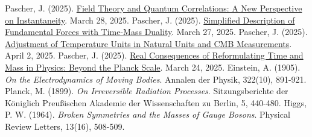 \documentclass[a4paper,12pt]{article}
\begin{document}
\begin{thebibliography}{99}
		 Pascher, J. (2025). \href{https://github.com/jpascher/T0-Time-Mass-Duality/tree/main/2/pdf/English/FeldtheorieQuantenEn.pdf}{Field Theory and Quantum Correlations: A New Perspective on Instantaneity}. March 28, 2025.
		 Pascher, J. (2025). \href{https://github.com/jpascher/T0-Time-Mass-Duality/tree/main/2/pdf/English/VierKraefteZeitMasseEn.pdf}{Simplified Description of Fundamental Forces with Time-Mass Duality}. March 27, 2025.
		 Pascher, J. (2025). \href{https://github.com/jpascher/T0-Time-Mass-Duality/tree/main/2/pdf/English/TempEinheitenCMBEn.pdf}{Adjustment of Temperature Units in Natural Units and CMB Measurements}. April 2, 2025.
		 Pascher, J. (2025). \href{https://github.com/jpascher/T0-Time-Mass-Duality/tree/main/2/pdf/English/JenseitsPlanckEn.pdf}{Real Consequences of Reformulating Time and Mass in Physics: Beyond the Planck Scale}. March 24, 2025.
		 Einstein, A. (1905). \textit{On the Electrodynamics of Moving Bodies}. Annalen der Physik, 322(10), 891-921.
		 Planck, M. (1899). \textit{On Irreversible Radiation Processes}. Sitzungsberichte der Königlich Preußischen Akademie der Wissenschaften zu Berlin, 5, 440-480.
		 Higgs, P. W. (1964). \textit{Broken Symmetries and the Masses of Gauge Bosons}. Physical Review Letters, 13(16), 508-509.
	\end{thebibliography}
	
\end{document}
